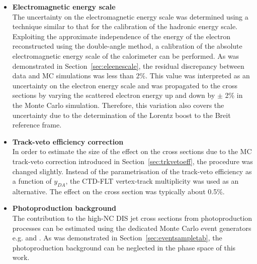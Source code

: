 \begin{itemize}
	\item \textbf{Electromagnetic energy scale}\\
		The uncertainty on the electromagnetic energy scale was determined using a technique similar to that for the calibration of the hadronic energy scale. Exploiting the approximate independence of the energy of the electron reconstructed using the double-angle method, a calibration of the absolute electromagnetic energy scale of the calorimeter can be performed. As was demonstrated in Section~\ref{sec:eleenescale}, the residual discrepancy between data and MC simulations was less than 2\%. This value was interpreted as an uncertainty on the electron energy scale and was propagated to the cross sections by varying the scattered electron energy up and down by $\pm$ 2\% in the Monte Carlo simulation. Therefore, this variation also covers the uncertainty due to the determination of the Lorentz boost to the Breit reference frame. 
	
	\item \textbf{Track-veto efficiency correction}\\
		In order to estimate the size of the effect on the cross sections due to the MC track-veto correction introduced in Section~\ref{sec:trkvetoeff}, the procedure was changed slightly. Instead of the parametrisation of the track-veto efficiency as a function of $y_{DA}$, the CTD-FLT vertex-track multiplicity was used as an alternative. The effect on the cross section was typically about 0.5\%.
	
	\item \textbf{Photoproduction background}\\
		The contribution to the high-\qsq NC DIS jet cross sections from photoproduction processes can be estimated using the dedicated Monte Carlo event generators e.g. \pythia and \herwig. As was demonstrated in Section~\ref{sec:eventsampletab}, the photoproduction background can be neglected in the phase space of this work.
	

\end{itemize}
